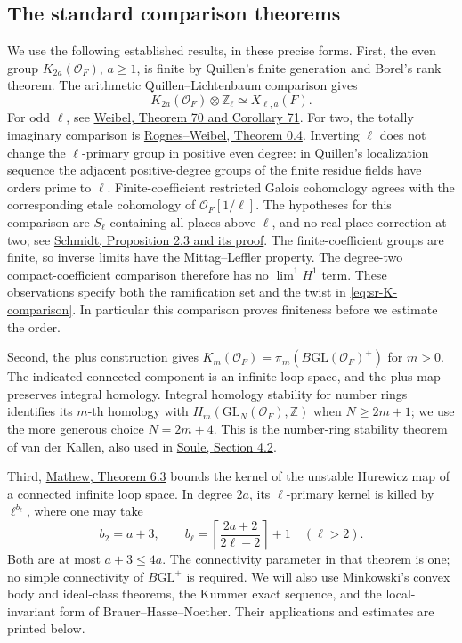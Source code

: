 \subsection{The standard comparison theorems}
We use the following established results, in these precise forms.
First, the even group \(K_{2a}(\mathcal O_F)\), \(a\geq1\),
is finite by Quillen's finite generation and Borel's rank theorem.
The arithmetic Quillen--Lichtenbaum comparison gives
\begin{equation}\label{eq:sr-K-comparison}
 K_{2a}(\mathcal O_F)\otimes\mathbb Z_\ell
                      \simeq X_{\ell,a}(F).
\end{equation}
For odd \(\ell\), see
\href{https://www.sas.rochester.edu/mth/sites/doug-ravenel/otherpapers/weibel-ints.pdf}{Weibel, Theorem 70 and Corollary 71}.
For two, the totally imaginary comparison is
\href{https://sites.math.rutgers.edu/~weibel/archive/papers-dir/RognesWeibel.pdf}{Rognes--Weibel, Theorem 0.4}.
Inverting \(\ell\) does not change the \(\ell\)-primary group in
positive even degree: in Quillen's localization sequence the adjacent
positive-degree groups of the finite residue fields have orders prime
to \(\ell\).
Finite-coefficient restricted Galois cohomology agrees with the
corresponding etale cohomology of \(\mathcal O_F[1/\ell]\).
The hypotheses for this comparison are \(S_\ell\) containing all
places above \(\ell\), and no real-place correction at two; see
\href{https://www.mathi.uni-heidelberg.de/~schmidt/papers/kpi1.pdf}{Schmidt, Proposition 2.3 and its proof}.
The finite-coefficient groups are finite, so inverse limits have the
Mittag--Leffler property. The degree-two compact-coefficient comparison
therefore has no \(\lim^1 H^1\) term. These observations specify both
the ramification set and the twist in \eqref{eq:sr-K-comparison}.
In particular this comparison proves finiteness before we estimate
the order.

Second, the plus construction gives
\(K_m(\mathcal O_F)=\pi_m(B\mathrm{GL}(\mathcal O_F)^+)\) for \(m>0\).
The indicated connected component is an infinite loop space, and the
plus map preserves integral homology.
Integral homology stability for number rings identifies its \(m\)-th
homology with
\(H_m(\mathrm{GL}_N(\mathcal O_F),\mathbb Z)\) when
\(N\geq2m+1\); we use the more generous choice
\(N=2m+4\).
This is the number-ring stability theorem of van der Kallen, also used
in
\href{https://www.maths.tcd.ie/EMIS/journals/DMJDMV/vol-kato/soule.dm.pdf}{Soule, Section 4.2}.

Third,
\href{https://msp.org/agt/2016/16-2/agt-v16-n2-p12-p.pdf}{Mathew, Theorem 6.3}
bounds the kernel of the unstable Hurewicz map of a connected infinite
loop space. In degree \(2a\), its \(\ell\)-primary kernel is killed by
\(\ell^{b_\ell}\), where one may take
\[
 b_2=a+3,\qquad
 b_\ell=\left\lceil\frac{2a+2}{2\ell-2}\right\rceil+1
                                             \quad(\ell>2).
\]
Both are at most \(a+3\leq4a\).
The connectivity parameter in that theorem is one; no simple
connectivity of \(B\mathrm{GL}^+\) is required.
We will also use Minkowski's convex body and ideal-class theorems,
the Kummer exact sequence, and the local-invariant form of
Brauer--Hasse--Noether. Their applications and estimates are printed
below.

